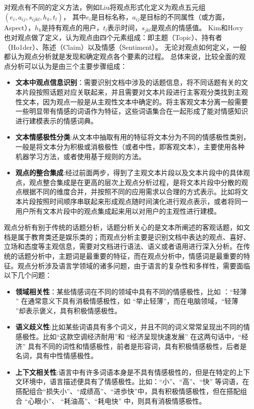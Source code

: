 对观点有不同的定义方法，例如Liu将观点形式化定义为观点五元组$ (e_i,a_{ij},s_{ijkl},h_k,t_l)$，
其中$ e_i $是目标名称，$ a_{ij} $是目标的不同属性（或方面，Aspect），$ h_k$是持有观点的用户，$ t_l$表示时间，$ s_{jkl}$是观点的情感值。
Kim和Hovy也对观点做了定义，认为观点由四个元素组成：即主题（Topic）、持有者（Ho1der）、陈述（Claim）以及情感（Sentiment）。
无论对观点如何定义，一般都认为观点分析就是发现和确定观点各个要素的过程。
总体来说，比较全面的观点分析可以认为是由三个主要步骤组成：
\begin{itemize}
\item \textbf{文本中观点信息识别}：需要识别文档中涉及的话题信息，将不同话题有关的文本片段按照话题对应关联起来，并且需要对文本片段进行主客观分类找到主观性文本，因为观点一般是从主观性文本中确定的。将主客观文本分离一般需要一些明显带有情感的词语作为特征，这些词语集合在一起形成了能对情感知识进行建模表示的情感词典。
\item \textbf{文本情感极性分类}:从文本中抽取有用的特征将文本分为不同的情感极性类别，一般是将文本分为积极或消极极性（或者中性，即客观文本），主要使用各种机器学习方法，或者使用基于规则的方法。
\item \textbf{观点的整合集成}:经过前面两步，得到了主观文本片段以及文本片段中的具体观点，观点整合集成是在更高的层次上观点分析过程，是将文本片段中分散的观点根据不同的维度合并，并按照不同的应用需求以合理的方式表示。比如将文本片段按照时间顺序串联起来形成观点随时间演化进行观点表示，或者将同一用户所有文本片段中的观点集成起来用以对用户的主观性进行建模。
\end{itemize}

观点分析有别于传统的话题分析，话题分析关心的是文本所阐述的客观话题，如文档是属于教育类还是娱乐类的；而观点分析主要是识别文档中表达的观点、喜好、立场和态度等主观信息，需要对文档进行语法、语义或者语用进行深入分析。在传统的话题分析中，主题词是最重要的特征，而在观点分析中，情感词是最重要的特征。观点分析涉及语言学领域的诸多问题，由于语言的复杂性和多样性，需要面临以下几个问题：

\begin{itemize}
\item \textbf{领域相关性}：某些情感词在不同的领域中具有不同的情感极性，比如 ：``轻薄 '' 在通常意义下具有消极情感极性，如 ``举止轻薄''，而在电脑领域，``轻薄 ''却表示褒义，具有积极情感极性。
\item \textbf{语义歧义性}:比如某些词语具有多个词义，并且不同的词义常常呈现出不同的情感极性。比如``这款空调经济耐用''和 ``经济呈现快速发展'' 在这两句话中，``经济'' 具有不同的词性和情感极性，前者是形容词，具有积极情感极性，后者是名词，具有中性情感极性。
\item \textbf{上下文相关性}:语言中有许多词语本身是不具有情感极性的，但是在特定的上下文环境中，语言描述便具有了情感极性。比如：``小''、``高''、``快'' 等词语，在搭配组合``损失小''、``成绩高''、``进歩快''中，具有积极情感极性，但在搭配组合 ``心眼小''、 ``耗油高''、``耗电快'' 中，则具有消极情感极性。
\end{itemize}

